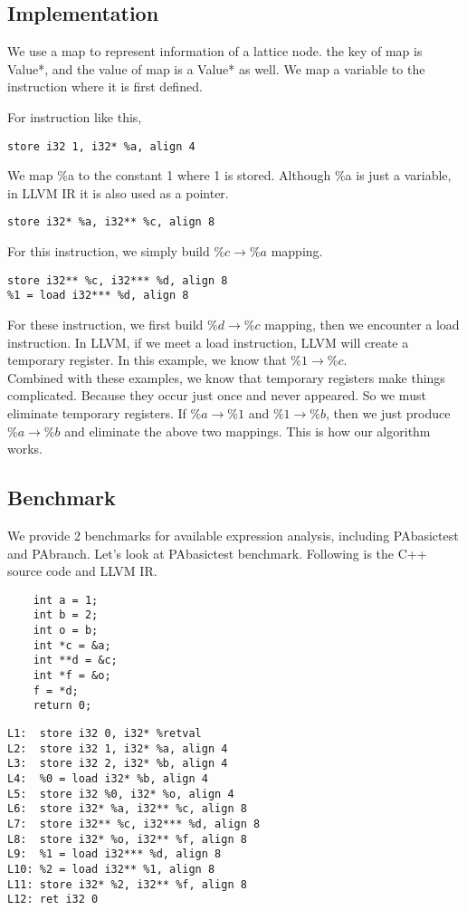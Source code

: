 \subsection{Implementation}
We use a map to represent information of a lattice node. the key of map is Value*, and the value of map is a Value* as well. We map a variable to the instruction where it is first defined. 

For instruction like this, 
\begin{verbatim}
store i32 1, i32* %a, align 4
\end{verbatim}
We map \%a to the constant 1 where 1 is stored. Although \%a is just a variable, in LLVM IR it is also used as a pointer.

\begin{verbatim}
store i32* %a, i32** %c, align 8 
\end{verbatim}
For this instruction, we simply build $\%c \to \%a$ mapping.

\begin{verbatim}
store i32** %c, i32*** %d, align 8
%1 = load i32*** %d, align 8
\end{verbatim}
For these instruction, we first build $\%d \to \%c$ mapping, then we encounter a load instruction. In LLVM, if we meet a load instruction, LLVM will create a temporary register. In this example, we know that $\%1 \to \%c$. \\

Combined with these examples, we know that temporary registers make things complicated. Because they occur just once and never appeared. So we must eliminate temporary registers. If $\%a \to \%1$ and $\%1 \to \%b$, then we just produce $\%a \to \%b$ and eliminate the above two mappings. This is how our algorithm works.

\subsection{Benchmark}
We provide 2 benchmarks for available expression analysis, including PAbasictest and PAbranch. Let's look at PAbasictest benchmark. Following is the C++ source code and LLVM IR.
\begin{verbatim}
	int a = 1;
	int b = 2;
	int o = b;
	int *c = &a;
	int **d = &c;
	int *f = &o;
	f = *d;
	return 0;
\end{verbatim}

\begin{verbatim}
L1:  store i32 0, i32* %retval
L2:  store i32 1, i32* %a, align 4
L3:  store i32 2, i32* %b, align 4
L4:  %0 = load i32* %b, align 4
L5:  store i32 %0, i32* %o, align 4
L6:  store i32* %a, i32** %c, align 8
L7:  store i32** %c, i32*** %d, align 8
L8:  store i32* %o, i32** %f, align 8
L9:  %1 = load i32*** %d, align 8
L10: %2 = load i32** %1, align 8
L11: store i32* %2, i32** %f, align 8
L12: ret i32 0
\end{verbatim}

